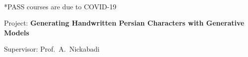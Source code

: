 \begin{cventries}
{\begin{cvitems}
{\begin{adjustwidth}{4mm}{}
\begin{tabular}{l@{\hskip 5mm}l@{\hskip 5mm}l}
            \end{tabular}
            \\[1mm]
            {\fontsize{8pt}{1em}\bodyfontlight\upshape\color{text} *PASS courses are due to COVID-19}
          	\medskip
          \end{adjustwidth}
        }
        \item{
          Project: \textbf{Generating Handwritten Persian Characters with Generative Models}
        }
        \item{
          Supervisor: Prof.~A.~Nickabadi
        }
      \end{cvitems}
    }


\vspace*{-1mm}

\end{cventries}
